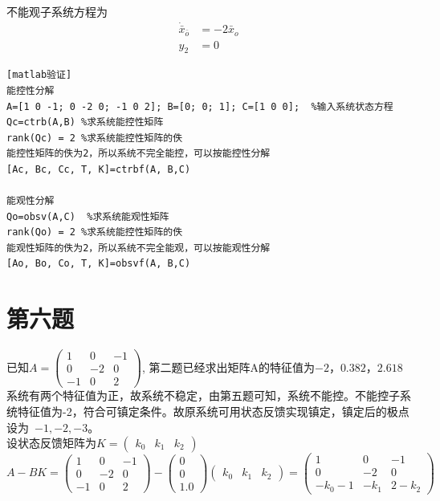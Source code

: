 \documentclass{article}
\begin{document}
不能观子系统方程为\\
\begin{align*}
\dot{\bar{x}}_{\bar{o}} &= -2\bar{x}_o \\
y_2 &= 0
\end{align*}
\begin{verbatim}[matlab验证]
能控性分解
A=[1 0 -1; 0 -2 0; -1 0 2]; B=[0; 0; 1]; C=[1 0 0];  %输入系统状态方程
Qc=ctrb(A,B) %求系统能控性矩阵
rank(Qc) = 2 %求系统能控性矩阵的佚  
能控性矩阵的佚为2，所以系统不完全能控，可以按能控性分解
[Ac, Bc, Cc, T, K]=ctrbf(A, B,C)

能观性分解
Qo=obsv(A,C)  %求系统能观性矩阵   
rank(Qo) = 2 %求系统能控性矩阵的佚
能观性矩阵的佚为2，所以系统不完全能观，可以按能观性分解
[Ao, Bo, Co, T, K]=obsvf(A, B,C)
\end{verbatim}
\section*{第六题}
已知$A=\left(\begin{array}{ccc} 1 & 0 & -1\\ 0 & -2 & 0\\ -1 & 0 & 2 \end{array}\right)$, 第二题已经求出矩阵A的特征值为$ -2， 0.382， 2.618$ \\
系统有两个特征值为正，故系统不稳定，由第五题可知，系统不能控。不能控子系统特征值为-2，符合可镇定条件。\mbox{故原系统可用状态反馈实现镇定，镇定后的极点设为 }$ -1,-2,-3 $。 \\
设状态反馈矩阵为$K=\left(\begin{array}{ccc} k_0 & k_1 & k_2 \end{array}\right)$ \\
$$ A-BK=\left(\begin{array}{ccc} 1 & 0 & -1\\ 0 & -2 & 0\\ -1 & 0 & 2 \end{array}\right)-
\left(\begin{array}{c} 0\\ 0\\ 1.0 \end{array}\right)
\left(\begin{array}{ccc} k_0 & k_1 & k_2 \end{array}\right)=\left(\begin{array}{ccc} 1 & 0 & -1\\ 0 & -2 & 0\\  - k_0 - 1 & -k_1 & 2 - k_2 \end{array}\right) $$
\end{document}
